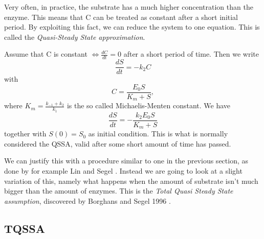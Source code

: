 \documentclass[12pt]{article}
\begin{document}
Very often, in practice, the substrate has a much higher concentration
than the enzyme. This means that C can be treated as constant after a
short initial period. By exploiting this fact, we can reduce the
system to one equation. This is called the \textit{Quasi-Steady State
  approximation}.

Assume that C is constant $\iff \frac{dC}{dt} = 0$ after a short
period of time. Then we write
\begin{equation}
\frac{dS}{dt} = -k_2 C
\end{equation}
with
\begin{equation}
C = \frac{E_0 S}{K_m +S},
\end{equation}
where $K_m = \frac{k_{-1} + k_2}{k_1}$ is the so called {Michaelis-Menten
constant}. We have
\begin{equation}
\frac{dS}{dt} = - \frac{k_2 E_0 S}{K_m + S}
\end{equation}
together with $S(0) = S_0$ as initial condition. This is what is
normally considered the QSSA, valid after some short amount of time
has passed.

We can justify this with a procedure similar to one in the previous
section, as done by for example Lin and Segel
\cite{lin1974mathematics}. Instead we are going to look at a slight
variation of this, namely what happens when the amount of substrate
isn't much bigger than the amount of enzymes. This is the
\textit{Total Quasi Steady State assumption}, discovered by Borghans
and Segel 1996 \cite{borghans1996extending}.

\subsection{TQSSA}
\end{document}

